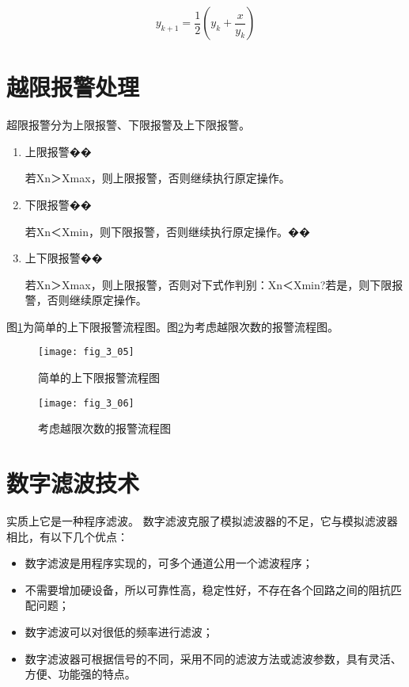 \begin{equation}
y_{k+1}=\frac{1}{2}(y_{k}+\frac{x}{y_{k}})
\end{equation}



\section{越限报警处理}

超限报警分为上限报警、下限报警及上下限报警。

\begin{enumerate}
  \item 上限报警��

       若Xn＞Xmax，则上限报警，否则继续执行原定操作。
  \item 下限报警��

      若Xn＜Xmin，则下限报警，否则继续执行原定操作。��
  \item 上下限报警��

      若Xn＞Xmax，则上限报警，否则对下式作判别：Xn＜Xmin?若是，则下限报警，否则继续原定操作。
\end{enumerate}

图\ref{fig_3_05}为简单的上下限报警流程图。图\ref{fig_3_06}为考虑越限次数的报警流程图。
\begin{figure}[h]
  \centering
  \texttt{[image: fig\_3\_05]}\\
  \caption{简单的上下限报警流程图}\label{fig_3_05}
\end{figure}

\begin{figure}[h]
  \centering
  \texttt{[image: fig\_3\_06]}\\
  \caption{考虑越限次数的报警流程图}\label{fig_3_06}
\end{figure}




\section{数字滤波技术}

实质上它是一种程序滤波。  数字滤波克服了模拟滤波器的不足，它与模拟滤波器相比，有以下几个优点：
\begin{itemize}
  \item 数字滤波是用程序实现的，可多个通道公用一个滤波程序；

  \item 不需要增加硬设备，所以可靠性高，稳定性好，不存在各个回路之间的阻抗匹配问题；

  \item 数字滤波可以对很低的频率进行滤波；

  \item 数字滤波器可根据信号的不同，采用不同的滤波方法或滤波参数，具有灵活、方便、功能强的特点。

\end{itemize}


